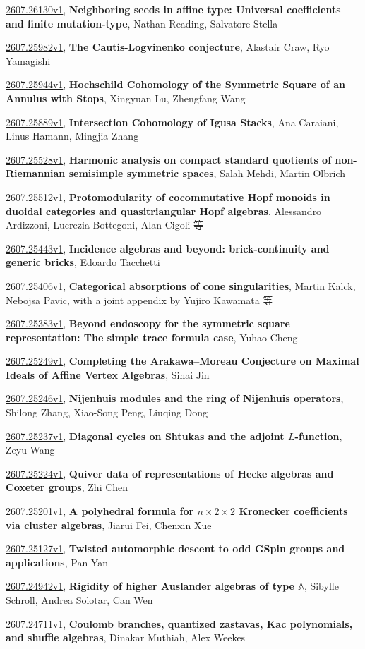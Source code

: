 \documentclass[9pt, a4paper]{article}
\theoremstyle{plain}
\theoremstyle{definition}
\theoremstyle{remark}
\newcommand{\arxiv}[3]{\href{https://arxiv.org/abs/#1}{#1}, \textbf{\textcolor{arxivblue}{#2}}, #3}
\begin{document}
\arxiv{2607.26130v1}{Neighboring seeds in affine type: Universal coefficients and finite mutation-type}{Nathan Reading, Salvatore Stella}

\arxiv{2607.25982v1}{The Cautis-Logvinenko conjecture}{Alastair Craw, Ryo Yamagishi}

\arxiv{2607.25944v1}{Hochschild Cohomology of the Symmetric Square of an Annulus with Stops}{Xingyuan Lu, Zhengfang Wang}

\arxiv{2607.25889v1}{Intersection Cohomology of Igusa Stacks}{Ana Caraiani, Linus Hamann, Mingjia Zhang}

\arxiv{2607.25528v1}{Harmonic analysis on compact standard quotients of non-Riemannian semisimple symmetric spaces}{Salah Mehdi, Martin Olbrich}

\arxiv{2607.25512v1}{Protomodularity of cocommutative Hopf monoids in duoidal categories and quasitriangular Hopf algebras}{Alessandro Ardizzoni, Lucrezia Bottegoni, Alan Cigoli 等}

\arxiv{2607.25443v1}{Incidence algebras and beyond: brick-continuity and generic bricks}{Edoardo Tacchetti}

\arxiv{2607.25406v1}{Categorical absorptions of cone singularities}{Martin Kalck, Nebojsa Pavic, with a joint appendix by Yujiro Kawamata 等}

\arxiv{2607.25383v1}{Beyond endoscopy for the symmetric square representation: The simple trace formula case}{Yuhao Cheng}

\arxiv{2607.25249v1}{Completing the Arakawa--Moreau Conjecture on Maximal Ideals of Affine Vertex Algebras}{Sihai Jin}

\arxiv{2607.25246v1}{Nijenhuis modules and the ring of Nijenhuis operators}{Shilong Zhang, Xiao-Song Peng, Liuqing Dong}

\arxiv{2607.25237v1}{Diagonal cycles on Shtukas and the adjoint $L$-function}{Zeyu Wang}

\arxiv{2607.25224v1}{Quiver data of representations of Hecke algebras and Coxeter groups}{Zhi Chen}

\arxiv{2607.25201v1}{A polyhedral formula for $n\times2\times2$ Kronecker coefficients via cluster algebras}{Jiarui Fei, Chenxin Xue}

\arxiv{2607.25127v1}{Twisted automorphic descent to odd GSpin groups and applications}{Pan Yan}

\arxiv{2607.24942v1}{Rigidity of higher Auslander algebras of type $\mathbb{A}$}{Sibylle Schroll, Andrea Solotar, Can Wen}

\arxiv{2607.24711v1}{Coulomb branches, quantized zastavas, Kac polynomials, and shuffle algebras}{Dinakar Muthiah, Alex Weekes}
\end{document}

